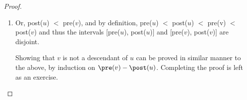 \begin{proof}
\begin{enumerate}
	  \item Or, post($u$) $<$ pre($v$), and by definition, pre($u$) $<$ post($u$) $<$ pre(v) $<$ post($v$) and thus the intervals [pre($u$), post($u$)] and [pre($v$), post($v$)] are disjoint. 

	    Showing that $v$ is not a descendant of $u$ can be proved in similar manner to the above, by induction on $\pre(v) - \post(u)$. Completing the proof is left as an exercise. 
	\end{enumerate}
\end{proof}
